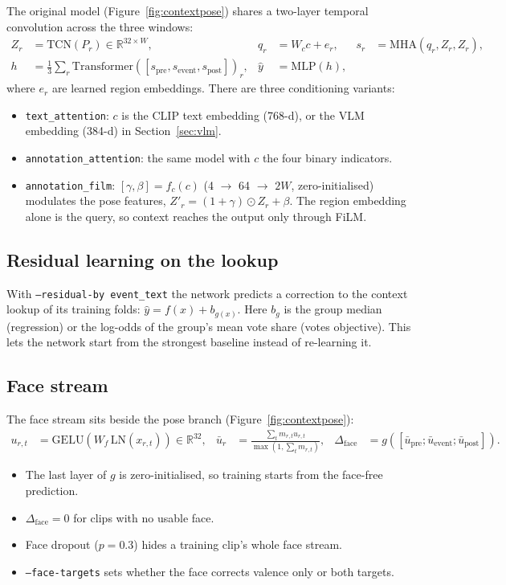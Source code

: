 \documentclass[11pt]{article}
\newcommand{\code}[1]{\texttt{#1}}
\begin{document}
The original model (Figure~\ref{fig:contextpose}) shares a two-layer temporal convolution across the three windows:
\begin{align}
Z_r &= \mathrm{TCN}(P_r) \in \mathbb{R}^{32 \times W}, &
q_r &= W_c c + e_r, &
s_r &= \mathrm{MHA}(q_r, Z_r, Z_r),\\
h &= \tfrac{1}{3}\textstyle\sum_r \mathrm{Transformer}([s_{\text{pre}}, s_{\text{event}}, s_{\text{post}}])_r, &
\hat{y} &= \mathrm{MLP}(h),
\end{align}
where $e_r$ are learned region embeddings. There are three conditioning variants:
\begin{itemize}
  \item \code{text\_attention}: $c$ is the CLIP text embedding (768-d), or the VLM embedding (384-d) in Section~\ref{sec:vlm}.
  \item \code{annotation\_attention}: the same model with $c$ the four binary indicators.
  \item \code{annotation\_film}: $[\gamma, \beta] = f_c(c)$ (4 $\to$ 64 $\to$ $2W$, zero-initialised) modulates the pose features, $Z'_r = (1+\gamma) \odot Z_r + \beta$. The region embedding alone is the query, so context reaches the output only through FiLM.
\end{itemize}

\subsection{Residual learning on the lookup}
With \code{--residual-by event\_text} the network predicts a correction to the context lookup of its training folds: $\hat{y} = f(x) + b_{g(x)}$. Here $b_g$ is the group median (regression) or the log-odds of the group's mean vote share (votes objective). This lets the network start from the strongest baseline instead of re-learning it.

\subsection{Face stream}
The face stream sits beside the pose branch (Figure~\ref{fig:contextpose}):
\begin{align}
u_{r,t} &= \mathrm{GELU}(W_f\, \mathrm{LN}(x_{r,t})) \in \mathbb{R}^{32}, &
\bar{u}_r &= \frac{\sum_t m_{r,t} u_{r,t}}{\max(1, \sum_t m_{r,t})}, &
\Delta_{\text{face}} &= g([\bar{u}_{\text{pre}}; \bar{u}_{\text{event}}; \bar{u}_{\text{post}}]).
\end{align}
\begin{itemize}
  \item The last layer of $g$ is zero-initialised, so training starts from the face-free prediction.
  \item $\Delta_{\text{face}} = 0$ for clips with no usable face.
  \item Face dropout ($p = 0.3$) hides a training clip's whole face stream.
  \item \code{--face-targets} sets whether the face corrects valence only or both targets.
\end{itemize}
\end{document}

